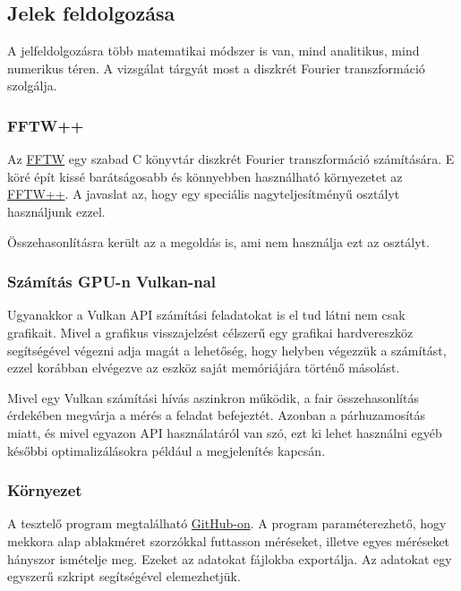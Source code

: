 
\subsection{Jelek feldolgoz\'asa}

A jelfeldolgoz\'asra t\"obb matematikai m\'odszer is van, mind analitikus, mind numerikus t\'eren.
A vizsg\'alat t\'argy\'at most a diszkr\'et Fourier transzform\'aci\'o szolg\'alja.

\subsubsection{FFTW++}
Az \href{http://www.fftw.org/}{FFTW} egy szabad C k\"onyvt\'ar diszkr\'et Fourier transzform\'aci\'o sz\'am\'it\'as\'ara.
E k\"or\'e \'ep\'it kiss\'e bar\'ats\'agosabb \'es k\"onnyebben haszn\'alhat\'o k\"ornyezetet az \href{http://fftwpp.sourceforge.net/}{FFTW++}.
A javaslat az, hogy egy speci\'alis nagyteljes\'itm\'eny\H u  oszt\'alyt haszn\'aljunk ezzel.

\"Osszehasonl\'it\'asra ker\"ult az a megold\'as is, ami nem haszn\'alja ezt az oszt\'alyt.

\subsubsection{Sz\'am\'it\'as GPU-n Vulkan-nal}
Ugyanakkor a Vulkan API sz\'am\'it\'asi feladatokat is el tud l\'atni nem csak grafikait. 
Mivel a grafikus visszajelz\'est c\'elszer\H u egy grafikai hardvereszk\"oz seg\'its\'eg\'evel v\'egezni adja mag\'at a lehet\H os\'eg, hogy helyben v\'egezz\"uk a sz\'am\'it\'ast, ezzel kor\'abban elv\'egezve az eszk\"oz saj\'at mem\'ori\'aj\'ara t\"ort\'en\H o m\'asol\'ast.

Mivel egy Vulkan sz\'am\'it\'asi h\'iv\'as aszinkron m\H uk\"odik, a fair \"osszehasonl\'it\'as \'erdek\'eben megv\'arja a m\'er\'es a feladat befejezt\'et. Azonban a p\'arhuzamos\'it\'as miatt, \'es mivel egyazon API haszn\'alat\'ar\'ol van sz\'o, ezt ki lehet haszn\'alni egy\'eb k\'es\H obbi optimaliz\'al\'asokra p\'eld\'aul a megjelen\'it\'es kapcs\'an.

\subsubsection{K\"ornyezet}
A tesztel\H o program megtal\'alhat\'o \href{https://github.com/petii/efop-signalproc}{GitHub-on}. 
A program param\'eterezhet\H o, hogy mekkora alap ablakm\'eret szorz\'okkal futtasson m\'er\'eseket, illetve egyes m\'er\'eseket h\'anyszor ism\'etelje meg. 
Ezeket az adatokat  f\'ajlokba export\'alja. Az adatokat egy egyszer\H u  szkript seg\'its\'eg\'evel elemezhetj\"uk.

